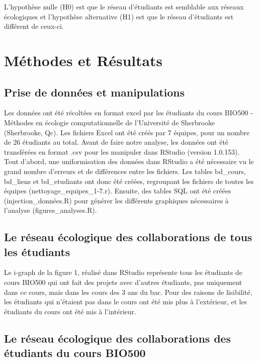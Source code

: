 \documentclass[twoside,twocolumn]{article}
\begin{document}
L'hypothèse nulle (H0) est que le réseau d'étudiants est semblable aux réseaux écologiques et l'hypothèse alternative (H1) est que le réseau d'étudiants est différent de ceux-ci.



\section{Méthodes et Résultats}


\subsection{Prise de données et manipulations}

Les données ont été récoltées en format excel par les étudiants du cours BIO500 - Méthodes en écologie computationnelle de l'Université de Sherbrooke (Sherbrooke, Qc). Les fichiers Excel ont été créés par 7 équipes, pour un nombre de 26 étudiants au total. Avant de faire notre analyse, les données ont été transférées en format .csv pour les manipuler dans RStudio (version 1.0.153).  Tout d'abord, une uniformisation des données dans RStudio a été nécessaire vu le grand nombre d'erreurs et de différences entre les fichiers. Les tables bd_cours, bd_liens et bd_etudiants ont donc été créées, regroupant les fichiers de toutes les équipes (nettoyage_equipes_1-7.r). Ensuite, des tables SQL ont été  créées (injection_données.R) pour générer les différents graphiques nécessaires à l'analyse (figures_analyses.R).


\subsection{Le réseau écologique des collaborations de tous les étudiants}

Le i-graph de la figure 1, réalisé dans RStudio représente tous les étudiants de cours BIO500 qui ont fait des projets avec d'autres étudiants, pas uniquement dans ce cours, mais dans les cours  des 3 ans du bac. Pour des raisons de lisibilité, les étudiants qui n'étaient pas dans le cours ont été mis plus à l'extérieur, et les étudiants du cours ont été mis à l'intérieur.


\subsection{Le réseau écologique des collaborations des étudiants du cours BIO500}
\end{document}
